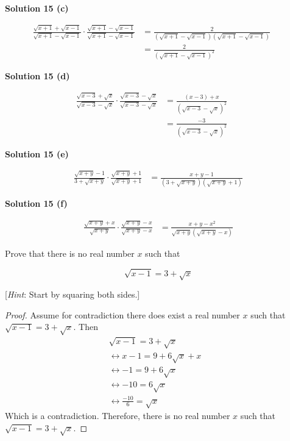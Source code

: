 \textbf{Solution 15 (c)}

\begin{align*}
    \frac{\sqrt{x + 1} + \sqrt{x - 1}}{\sqrt{x + 1} - \sqrt{x - 1}} 
        \cdot \frac{\sqrt{x + 1} - \sqrt{x - 1}}{\sqrt{x + 1} - \sqrt{x - 1}}
    &= \frac{2}{(\sqrt{x + 1} - \sqrt{x - 1})(\sqrt{x + 1} - \sqrt{x - 1})} && \\
    &= \frac{2}{{(\sqrt{x + 1} - \sqrt{x - 1})}^2}
\end{align*}

\textbf{Solution 15 (d)}

\begin{align*}
    \frac{\sqrt{x - 3} + \sqrt{x}}{\sqrt{x - 3} - \sqrt{x}}
        \cdot \frac{\sqrt{x - 3} - \sqrt{x}}{\sqrt{x - 3} - \sqrt{x}} 
        &= \frac{(x - 3) + x}{{(\sqrt{x - 3} - \sqrt{x})}^2} && \\
        &= \frac{-3}{{(\sqrt{x - 3} - \sqrt{x})}^2}
\end{align*}

\textbf{Solution 15 (e)}

\begin{align*}
    \frac{\sqrt{x + y} - 1}{3 + \sqrt{x + y}}
        \cdot \frac{\sqrt{x + y} + 1}{\sqrt{x + y} + 1}
        &= \frac{x + y - 1}{(3 + \sqrt{x + y})(\sqrt{x + y} + 1)}
\end{align*}

\textbf{Solution 15 (f)}

\begin{align*}
    \frac{\sqrt{x + y} + x}{\sqrt{x + y}}
        \cdot \frac{\sqrt{x + y} - x}{\sqrt{x + y} - x}
        &= \frac{x + y - x^2}{\sqrt{x + y}(\sqrt{x + y} - x)}
\end{align*}

\begin{tcolorbox}[title=Problem 17, breakable]
    Prove that there is no real number $x$ such that 

    \[\sqrt{x - 1} = 3 + \sqrt{x}\]

    [\emph{Hint}: Start by squaring both sides.]
\end{tcolorbox}

\begin{proof}
    Assume for contradiction there does exist a real number $x$ such that $\sqrt{x - 1} = 3  + \sqrt{x}$.
    Then 
        \begin{align*}
            & \sqrt{x - 1} = 3 + \sqrt{x} && \\
            &\leftrightarrow x - 1 = 9 + 6\sqrt{x} + x && \\
            &\leftrightarrow -1 = 9 + 6\sqrt{x} && \\
            &\leftrightarrow -10 = 6\sqrt{x} && \\
            &\leftrightarrow \frac{-10}{6} = \sqrt{x}
        \end{align*}
    Which is a contradiction. Therefore, there is no real number $x$
    such that $\sqrt{x - 1} = 3 + \sqrt{x}$.
\end{proof}

